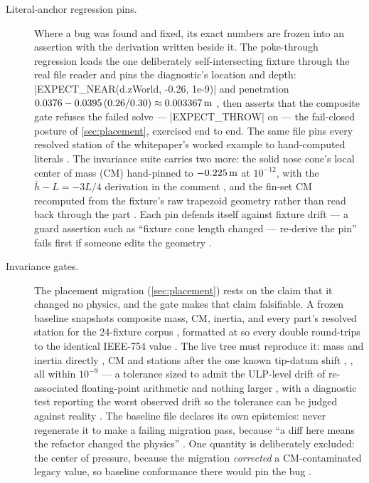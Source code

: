 \begin{description}
\item[Literal-anchor regression pins.] Where a bug was found and fixed, its exact
numbers are frozen into an assertion with the derivation written beside it. The
poke-through regression loads the one deliberately self-intersecting fixture through the
real file reader and pins the diagnostic's location and depth:
\cppinline|EXPECT_NEAR(d.zWorld, -0.26, 1e-9)| and penetration
$0.0376 - 0.0395\,(0.26/0.30) \approx 0.003367\,\mathrm{m}$
, then asserts that the composite gate
refuses the failed solve --- \cppinline|EXPECT_THROW| on 
 --- the fail-closed posture of
\cref{sec:placement}, exercised end to end. The same file pins every resolved station of
the whitepaper's worked example to hand-computed literals
. The invariance suite carries two more:
the solid nose cone's local center of mass (CM) hand-pinned to $-0.225\,\mathrm{m}$ at
$10^{-12}$, with the $\bar{h} - L = -3L/4$ derivation in the comment
, and the fin-set CM recomputed from the
fixture's raw trapezoid geometry rather than read back through the part
. Each pin defends itself against fixture
drift --- a guard assertion such as ``fixture cone length changed --- re-derive the pin''
fails first if someone edits the geometry .

\item[Invariance gates.] The placement migration (\cref{sec:placement}) rests on the
claim that it changed no physics, and the gate makes that claim falsifiable. A frozen
baseline snapshots composite mass, CM, inertia, and every part's resolved station for the
24-fixture corpus , formatted at
 so every double round-trips to the identical IEEE-754 value
. The live tree must reproduce it: mass and
inertia directly , CM and stations after the
one known tip-datum shift ,
, all within $10^{-9}$ --- a tolerance sized
to admit the ULP-level drift of re-associated floating-point arithmetic and nothing
larger , with a diagnostic test reporting
the worst observed drift so the tolerance can be judged against reality
. The baseline file declares its own
epistemics: never regenerate it to make a failing migration pass, because ``a diff here
means the refactor changed the physics''
. One quantity is deliberately
excluded: the center of pressure, because the migration \emph{corrected} a
CM-contaminated legacy value, so baseline conformance there would pin the bug
.


\end{description}

